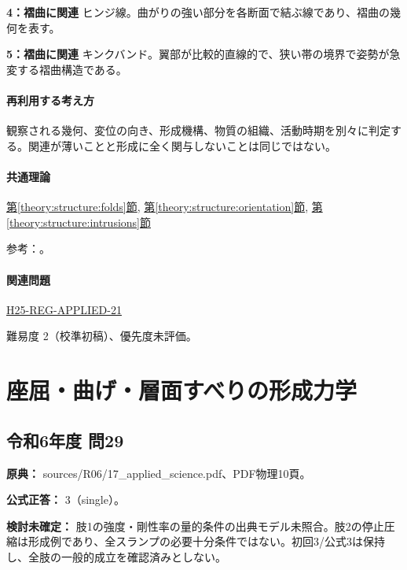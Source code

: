 \noindent\textbf{4：褶曲に関連} ヒンジ線。曲がりの強い部分を各断面で結ぶ線であり、褶曲の幾何を表す。\par

\noindent\textbf{5：褶曲に関連} キンクバンド。翼部が比較的直線的で、狭い帯の境界で姿勢が急変する褶曲構造である。\par

\paragraph{再利用する考え方} 観察される幾何、変位の向き、形成機構、物質の組織、活動時期を別々に判定する。関連が薄いことと形成に全く関与しないことは同じではない。

\paragraph{共通理論} \hyperref[theory:structure:folds]{第\ref*{theory:structure:folds}節}, \hyperref[theory:structure:orientation]{第\ref*{theory:structure:orientation}節}, \hyperref[theory:structure:intrusions]{第\ref*{theory:structure:intrusions}節}

\par 参考：\cite{str_intrusion,str_fold}。

\paragraph{関連問題} \hyperref[q:h25-reg-applied-21]{H25-REG-APPLIED-21}

\par 難易度 2（校準初稿）、優先度未評価。

\section{座屈・曲げ・層面すべりの形成力学}

\subsection{令和6年度 問29}
\label{q:r06-reg-applied-29}

\noindent\textbf{原典：} sources/R06/17\_applied\_science.pdf、PDF物理10頁。

\textbf{公式正答：} 3（single）。

\par\textbf{検討未確定：} 肢1の強度・剛性率の量的条件の出典モデル未照合。肢2の停止圧縮は形成例であり、全スランプの必要十分条件ではない。初回3/公式3は保持し、全肢の一般的成立を確認済みとしない。

